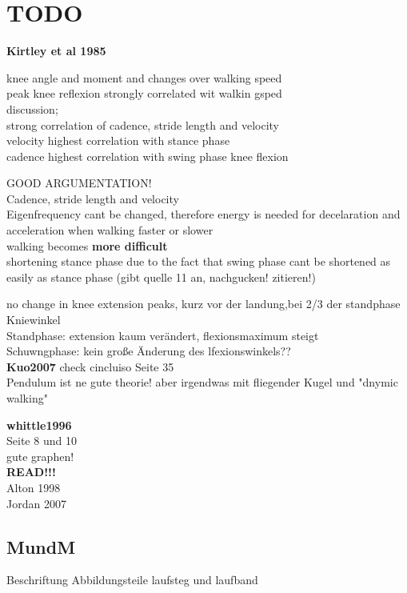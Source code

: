 \section{TODO}

\textbf{Kirtley et al 1985}

knee angle and moment and changes over walking speed\\
peak knee reflexion strongly correlated wit walkin gsped\\

discussion;\\
strong correlation of cadence, stride length and velocity\\
velocity highest correlation with stance phase\\
cadence highest correlation with swing phase knee flexion

GOOD ARGUMENTATION!\\
Cadence, stride length and velocity\\
Eigenfrequency cant be changed, therefore energy is needed for decelaration and acceleration when walking faster or slower\\
walking becomes \textbf{more difficult}\\

shortening stance phase due to the fact that swing phase cant be shortened as easily as stance phase (gibt quelle 11 an, nachgucken! zitieren!)

no change in knee extension peaks, kurz vor der landung,bei 2/3 der standphase\\

Kniewinkel\\
Standphase: extension kaum verändert, flexionsmaximum steigt\\
Schuwngphase: kein große Änderung des lfexionswinkels??\\

\textbf{Kuo2007}
check cincluiso Seite 35\\
Pendulum ist ne gute theorie! aber irgendwas mit fliegender Kugel und "dnymic walking"

\textbf{whittle1996}\\
Seite 8 und 10\\
gute graphen!\\

\textbf{READ!!!}\\
Alton 1998\\
Jordan 2007\\


\subsection{MundM}
Beschriftung Abbildungsteile laufsteg und laufband
